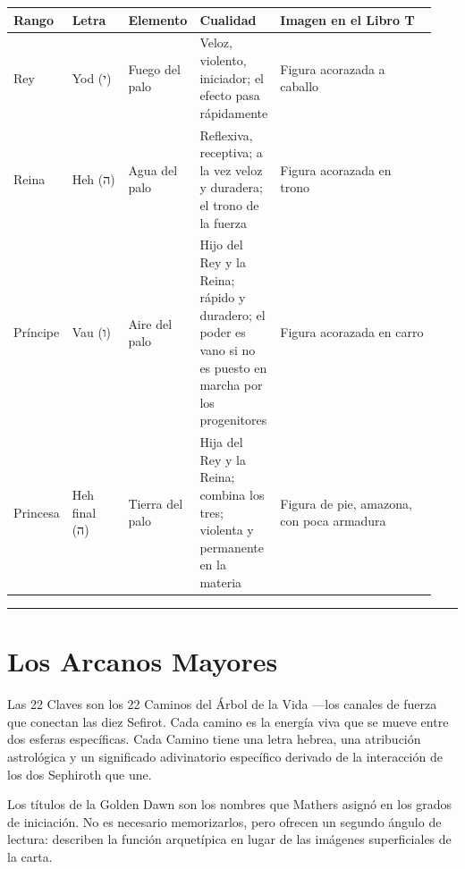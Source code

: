 \begin{longtable}[]{@{}>{\RaggedRight\small}p{0.10\linewidth}>{\RaggedRight\small}p{0.14\linewidth}>{\RaggedRight\small}p{0.12\linewidth}>{\RaggedRight\small}p{0.14\linewidth}>{\RaggedRight\small}p{0.44\linewidth}@{}}
\toprule\noalign{}
Rango & Letra & Elemento & Cualidad & Imagen en el Libro T \\
\midrule\noalign{}
\endhead
\bottomrule\noalign{}
\endlastfoot
Rey & Yod (י) & Fuego del palo & Veloz, violento, iniciador; el efecto pasa rápidamente & Figura acorazada a caballo \\
Reina & Heh (ה) & Agua del palo & Reflexiva, receptiva; a la vez veloz y duradera; el trono de la fuerza & Figura acorazada en trono \\
Príncipe & Vau (ו) & Aire del palo & Hijo del Rey y la Reina; rápido y duradero; el poder es vano si no es puesto en marcha por los progenitores & Figura acorazada en carro \\
Princesa & Heh final (ה) & Tierra del palo & Hija del Rey y la Reina; combina los tres; violenta y permanente en la materia & Figura de pie, amazona, con poca armadura \\
\end{longtable}

\begin{center}\rule{0.5\linewidth}{0.5pt}\end{center}

\section{Los Arcanos Mayores}\label{the-major-arcana}

Las 22 Claves son los 22 Caminos del Árbol de la Vida ---los canales de fuerza que conectan las diez Sefirot. Cada camino es la energía viva que se mueve entre dos esferas específicas. Cada Camino tiene una letra hebrea, una atribución astrológica y un significado adivinatorio específico derivado de la interacción de los dos Sephiroth que une.

Los títulos de la Golden Dawn son los nombres que Mathers asignó en los grados de iniciación. No es necesario memorizarlos, pero ofrecen un segundo ángulo de lectura: describen la función arquetípica en lugar de las imágenes superficiales de la carta.

